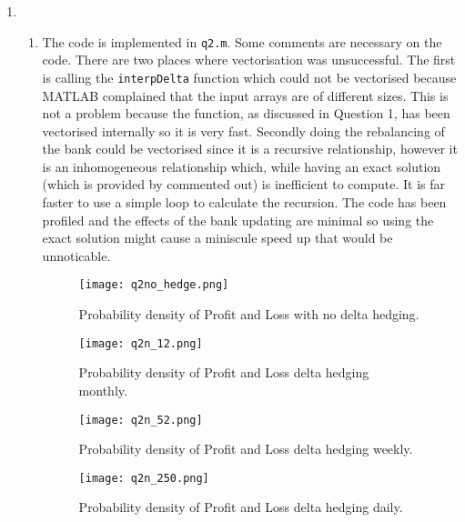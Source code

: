\documentclass[10pt,english]{article}
\theoremstyle{plain}
\begin{document}
\begin{enumerate}
\item
\begin{enumerate}
\item The code is implemented in \texttt{q2.m}. Some comments are necessary on the code. There are two places where vectorisation was unsuccessful. The first is calling the \texttt{interpDelta} function which could not be vectorised because MATLAB complained that the input arrays are of different sizes. This is not a problem because the function, as discussed in Question 1, has been vectorised internally so it is very fast. Secondly doing the rebalancing of the bank could be vectorised since it is a recursive relationship, however it is an inhomogeneous relationship which, while having an exact solution (which is provided by commented out) is inefficient to compute. It is far faster to use a simple loop to calculate the recursion. The code has been profiled and the effects of the bank updating are minimal so using the exact solution might cause a miniscule speed up that would be unnoticable.  
\begin{figure}
\begin{center}
\texttt{[image: q2no\_hedge.png]}
\caption{Probability density of Profit and Loss with no delta hedging.}
\label{nohedge}
\end{center}
\end{figure}
\begin{figure}
\begin{center}
\texttt{[image: q2n\_12.png]}
\caption{Probability density of Profit and Loss delta hedging monthly.}
\label{monthly}
\end{center}
\end{figure}
\begin{figure}
\begin{center}
\texttt{[image: q2n\_52.png]}
\caption{Probability density of Profit and Loss delta hedging weekly.} 
\label{weekly}
\end{center}
\end{figure}
\begin{figure}
\begin{center}
\texttt{[image: q2n\_250.png]}
\caption{Probability density of Profit and Loss delta hedging daily.}
\label{daily}
\end{center}
\end{figure}


\end{enumerate}
\end{enumerate}
\end{document}
